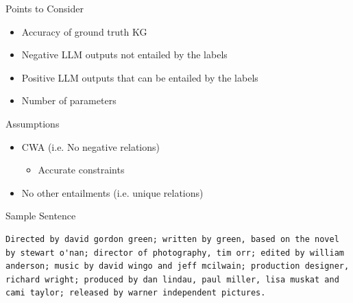 \documentclass[aspectratio=169,xcolor=dvipsnames]{beamer}
\begin{document}
\begin{frame}{Points to Consider}
    \begin{itemize}
        \item Accuracy of ground truth KG
        \item Negative LLM outputs not entailed by the labels
        \item Positive LLM outputs that can be entailed by the labels
        \item Number of parameters
    \end{itemize}
\end{frame}

\begin{frame}{Assumptions}
    \begin{itemize}
        \item CWA (i.e. No negative relations)
        \begin{itemize}
            \item[] Accurate constraints 
        \end{itemize}
        \item No other entailments (i.e. unique relations)
    \end{itemize}
\end{frame}

\begin{frame}[fragile]{Sample Sentence}
\begin{verbatim}
Directed by david gordon green; written by green, based on the novel by stewart o'nan; director of photography, tim orr; edited by william anderson; music by david wingo and jeff mcilwain; production designer, richard wright; produced by dan lindau, paul miller, lisa muskat and cami taylor; released by warner independent pictures. 
\end{verbatim}    
\end{frame}
\end{document}
